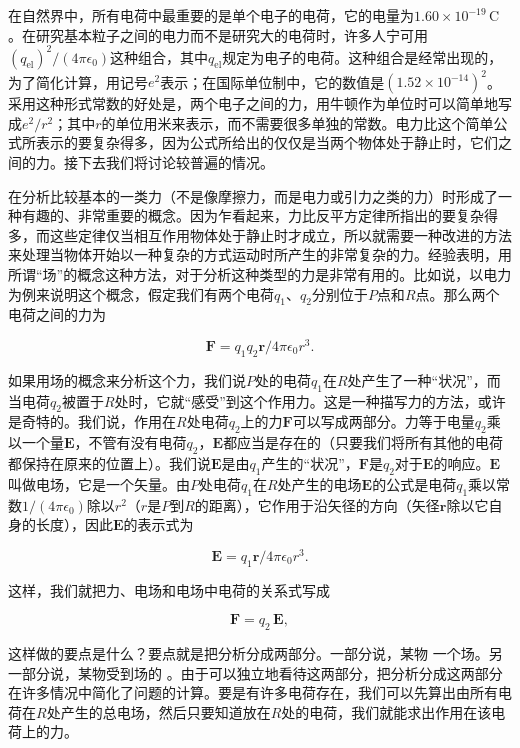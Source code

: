 \documentclass[12pt,oneside]{book}
\providecommand{\FLPvec}[1]{\boldsymbol{#1}}
\providecommand{\FLPE}[0]{\FLPvec{E}}
\providecommand{\FLPF}[0]{\FLPvec{F}}
\providecommand{\FLPr}[0]{\FLPvec{r}}
\begin{document}
在自然界中，所有电荷中最重要的是单个电子的电荷，它的电量为$1.60 \times 10^{-19} \, \text{C}$。在研究基本粒子之间的电力而不是研究大的电荷时，许多人宁可用$(q_{\text{el}})^2/(4\pi\epsilon_0)$这种组合，其中$q_{\text{el}}$规定为电子的电荷。这种组合是经常出现的，为了简化计算，用记号$e^2$表示；在国际单位制中，它的数值是$(1.52 \times 10^{-14})^2$。采用这种形式常数的好处是，两个电子之间的力，用牛顿作为单位时可以简单地写成$e^2/r^2$；其中$r$的单位用米来表示，而不需要很多单独的常数。电力比这个简单公式所表示的要复杂得多，因为公式所给出的仅仅是当两个物体处于静止时，它们之间的力。接下去我们将讨论较普遍的情况。


在分析比较基本的一类力（不是像摩擦力，而是电力或引力之类的力）时形成了一种有趣的、非常重要的概念。因为乍看起来，力比反平方定律所指出的要复杂得多，而这些定律仅当相互作用物体处于静止时才成立，所以就需要一种改进的方法来处理当物体开始以一种复杂的方式运动时所产生的非常复杂的力。经验表明，用所谓“场”的概念这种方法，对于分析这种类型的力是非常有用的。比如说，以电力为例来说明这个概念，假定我们有两个电荷$q_1$、$q_2$分别位于$P$点和$R$点。那么两个电荷之间的力为

\begin{equation}
\label{Eq:I:12:3}
\FLPF=q_1q_2\FLPr/4\pi\epsilon_0 r^3.
\end{equation}

如果用场的概念来分析这个力，我们说$P$处的电荷$q_1$在$R$处产生了一种“状况”，而当电荷$q_2$被置于$R$处时，它就“感受”到这个作用力。这是一种描写力的方法，或许是奇特的。我们说，作用在$R$处电荷$q_2$上的力$\FLPF$可以写成两部分。力等于电量$q_2$乘以一个量$\FLPE$，不管有没有电荷$q_2$，$\FLPE$都应当是存在的（只要我们将所有其他的电荷都保持在原来的位置上）。我们说$\FLPE$是由$q_1$产生的“状况”，$\FLPF$是$q_2$对于$\FLPE$的响应。$\FLPE$叫做电场，它是一个矢量。由$P$处电荷$q_1$在$R$处产生的电场$\FLPE$的公式是电荷$q_1$乘以常数$1/(4\pi\epsilon_0)$除以$r^2$（$r$是$P$到$R$的距离），它作用于沿矢径的方向（矢径$\FLPr$除以它自身的长度），因此$\FLPE$的表示式为


\begin{equation}
\label{Eq:I:12:4}
\FLPE=q_1\FLPr/4\pi\epsilon_0 r^3.
\end{equation}

这样，我们就把力、电场和电场中电荷的关系式写成


\begin{equation}
\label{Eq:I:12:5}
\FLPF=q_2\,\FLPE,
\end{equation}

这样做的要点是什么？要点就是把分析分成两部分。一部分说，某物  一个场。另一部分说，某物受到场的 。由于可以独立地看待这两部分，把分析分成这两部分在许多情况中简化了问题的计算。要是有许多电荷存在，我们可以先算出由所有电荷在$R$处产生的总电场，然后只要知道放在$R$处的电荷，我们就能求出作用在该电荷上的力。
\end{document}

